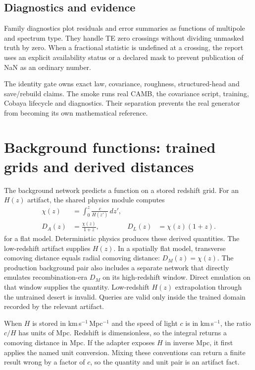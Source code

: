 \documentclass[10pt,aps,prd,twocolumn,nofootinbib]{revtex4-2}
\begin{document}
\subsection{Diagnostics and evidence}

Family diagnostics plot residuals and error summaries as functions of
multipole and spectrum type.  They handle TE zero crossings without dividing
unmasked truth by zero.  When a fractional statistic is undefined at a
crossing, the report uses an explicit availability status or a declared mask
to prevent publication of NaN as an ordinary number.

The identity gate owns exact law, covariance, roughness, structured-head and
save/rebuild claims.  The smoke runs real CAMB, the covariance script,
training, Cobaya lifecycle and diagnostics.  Their separation prevents the
real generator from becoming its own mathematical reference.

\section{Background functions: trained grids and derived distances}
\label{sec:background}

The background network predicts a function on a stored redshift grid.  For an
$H(z)$ artifact, the shared physics module computes
\begin{align}
  \chi(z)&=\int_0^z\frac{c}{H(z')}\,dz',\\
  D_A(z)&=\frac{\chi(z)}{1+z},&
  D_L(z)&=\chi(z)(1+z).
\end{align}
for a flat model.  Deterministic physics produces these derived quantities.
The low-redshift artifact supplies $H(z)$.  In a spatially flat
model, transverse comoving distance equals radial comoving distance:
$D_M(z)=\chi(z)$.  The production background pair also includes a separate
network that directly emulates recombination-era $D_M$ on its high-redshift
window.  Direct emulation on that window supplies the quantity.  Low-redshift
$H(z)$ extrapolation through the untrained desert is invalid.  Queries are valid only inside
the trained domain recorded by the relevant artifact.

When \(H\) is stored in km\,s\(^{-1}\)\,Mpc\(^{-1}\) and the speed of light
\(c\) is in km\,s\(^{-1}\), the ratio \(c/H\) has units of Mpc.  Redshift is
dimensionless, so the integral returns a comoving distance in Mpc.  If the
adapter exposes \(H\) in inverse Mpc, it first applies the named unit
conversion.  Mixing these conventions can return a finite result wrong by a
factor of \(c\), so the quantity and unit pair is an artifact fact.
\end{document}
